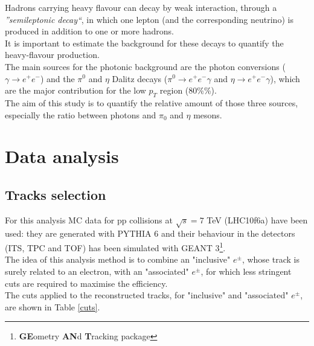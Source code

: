 \documentclass[a4paper,twocolumn,gsifonts,twoside]{gsipaper}
\begin{document}
Hadrons carrying heavy flavour can decay by weak interaction, through a \textit{''semileptonic decay``}, in which one lepton (and the 
corresponding neutrino) is produced in addition to one or more hadrons.\\
It is important to estimate the background for these decays to quantify the heavy-flavour production. \\

The main sources for the photonic background are the photon conversions ($\gamma\rightarrow e^{+}e^{-}$) and the $\pi^{0}$ and $\eta$
Dalitz decays ($\pi^{0} \rightarrow e^{+}e^{-}\gamma$ and $\eta \rightarrow e^{+}e^{-}\gamma$), which are the major contribution
for the low $p_{T}$ region (80\%\textdiv {}\%). \\
The aim of this study is to quantify the relative amount of those three sources, especially the ratio between photons and $\pi_{0}$ 
and $\eta$ mesons.

\section{Data analysis}
\subsection{Tracks selection}
For this analysis MC data for pp collisions at $\sqrt{s} = 7$ TeV (LHC10f6a) have been used: they are generated with PYTHIA 6
and their behaviour in the detectors (ITS, TPC and TOF) has been simulated with GEANT 3\footnote{\textbf{GE}ometry \textbf{AN}d 
\textbf{T}racking package}.\\

The idea of this analysis method is to combine an "inclusive" $e^{\pm}$, whose track is surely related to an electron, 
with an "associated" $e^{\pm}$, for which less stringent cuts are required to maximise the efficiency.\\
The cuts applied to the reconstructed tracks, for "inclusive" and "associated" $e^{\pm}$, are shown in Table \ref{cuts}.
\end{document}

